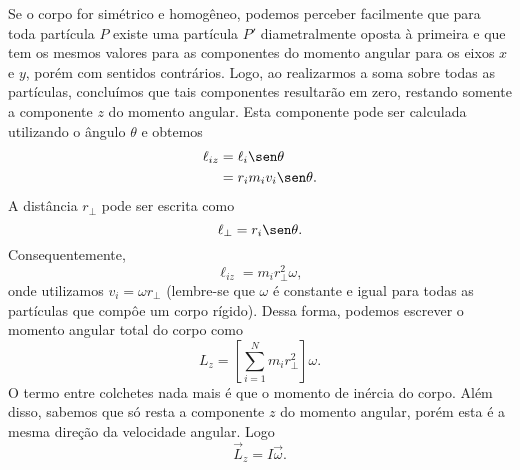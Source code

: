 \begin{marginfigure}
\centering
{}
\caption{. }
\end{marginfigure}
Se o corpo for simétrico e homogêneo, podemos perceber facilmente que para toda partícula $P$ existe uma partícula $P'$ diametralmente oposta à primeira e que tem os mesmos valores para as componentes do momento angular para os eixos $x$ e $y$, porém com sentidos contrários. Logo, ao realizarmos a soma sobre todas as partículas, concluímos que tais componentes resultarão em zero, restando somente a componente $z$ do momento angular. Esta componente pode ser calculada utilizando o ângulo $\theta$ e obtemos
\begin{align}
  \ell_{iz} &= \ell_i \sen\theta \\
  &= r_i m_i v_i \sen\theta.
\end{align}
%
A distância $r_{\perp}$ pode ser escrita como
\begin{equation}
  \ell_{\perp} = r_i\sen\theta.
\end{equation}
%
Consequentemente, 
\begin{equation}
  \ell_{iz} = m_i r_{\perp}^2 \omega,
\end{equation}
%
onde utilizamos $v_i = \omega r_{\perp}$ (lembre-se que $\omega$ é constante e igual para todas as partículas que compôe um corpo rígido). Dessa forma, podemos escrever o momento angular total do corpo como
\begin{equation}
  L_z = \left[\sum_{i=1}^N m_i r_{\perp}^2\right] \omega.
\end{equation}
%
O termo entre colchetes nada mais é que o momento de inércia do corpo. Além disso, sabemos que só resta a componente $z$ do momento angular, porém esta é a mesma direção da velocidade angular. Logo
\begin{equation}
  \vec{L}_z = I \vec{\omega}.
\end{equation}

